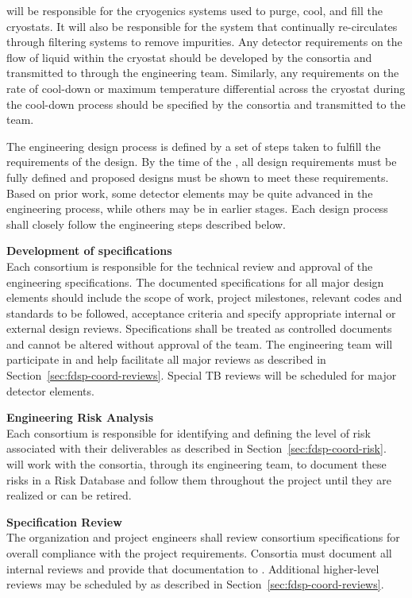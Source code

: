  will be responsible for the cryogenics systems used to purge,
cool, and fill the cryostats.  It will also be responsible for the
system that continually re-circulates \lar through filtering
systems to remove impurities.  Any detector requirements on the flow
of liquid within the cryostat should  be developed by the consortia and
transmitted to  through the  engineering team.  Similarly,
any requirements on the rate of cool-down or maximum temperature
differential across the cryostat during the cool-down process should
be specified by the consortia and transmitted to the  team.

The engineering design process is defined by a set of steps taken to
fulfill the requirements of the design.  By the time of the , 
all design requirements must be fully defined and
proposed designs must be shown to meet these requirements.  Based on
prior work, some detector elements may be quite advanced in the
engineering process, while others may be in earlier stages.  Each
design process shall closely follow the engineering steps described
below.


{\bf Development of specifications}\\ Each consortium is responsible
for the technical review and approval of the engineering
specifications.  The documented specifications for all major design
elements should include the scope of work, project milestones,
relevant codes and standards to be followed, acceptance criteria and
specify appropriate internal or external design reviews.
Specifications shall be treated as controlled documents and cannot be
altered without approval of the 
team.  The  engineering team will participate in and help facilitate
all major reviews as described in
Section~\ref{sec:fdsp-coord-reviews}.  Special TB reviews
will be scheduled for major detector elements.

{\bf Engineering Risk Analysis}\\ Each consortium is responsible for
identifying and defining the level of risk associated with their
deliverables as described in Section~\ref{sec:fdsp-coord-risk}.
 will work with the consortia,
through its  engineering team, to document these risks in a Risk
Database and follow them throughout the project until they are
realized or can be retired.

{\bf Specification Review}\\
The   organization and project engineers
shall review consortium specifications for overall compliance with the
project requirements.  Consortia must document all internal reviews
and provide that documentation to .
Additional higher-level reviews may be scheduled by 
as described in Section~\ref{sec:fdsp-coord-reviews}.

